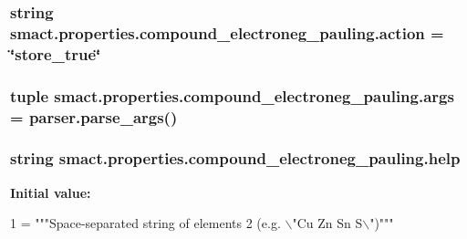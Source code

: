 \subsubsection[{action}]{\setlength{\rightskip}{0pt plus 5cm}string smact.\+properties.\+compound\+\_\+electroneg\+\_\+pauling.\+action = \char`\"{}store\+\_\+true\char`\"{}}\label{namespacesmact_1_1properties_1_1compound__electroneg__pauling_ac8037eaecb7855f19cbd9ddeec574a0c}
\hypertarget{namespacesmact_1_1properties_1_1compound__electroneg__pauling_a2e9bb2f62931326a2e8727a8e89b7ba7}{}
\subsubsection[{args}]{\setlength{\rightskip}{0pt plus 5cm}tuple smact.\+properties.\+compound\+\_\+electroneg\+\_\+pauling.\+args = parser.\+parse\+\_\+args()}\label{namespacesmact_1_1properties_1_1compound__electroneg__pauling_a2e9bb2f62931326a2e8727a8e89b7ba7}
\hypertarget{namespacesmact_1_1properties_1_1compound__electroneg__pauling_aa6c489930b1288598598e89ed78634af}{}
\subsubsection[{help}]{\setlength{\rightskip}{0pt plus 5cm}string smact.\+properties.\+compound\+\_\+electroneg\+\_\+pauling.\+help}\label{namespacesmact_1_1properties_1_1compound__electroneg__pauling_aa6c489930b1288598598e89ed78634af}
{\bfseries Initial value\+:}
\begin{DoxyCode}
1 = \textcolor{stringliteral}{"""Space-separated string of elements}
2 \textcolor{stringliteral}{                                (e.g. \(\backslash\)"Cu Zn Sn S\(\backslash\)")"""}
\end{DoxyCode}
\hypertarget{namespacesmact_1_1properties_1_1compound__electroneg__pauling_a1f1c8773c760e27a71b2f2447a812b3c}{}
